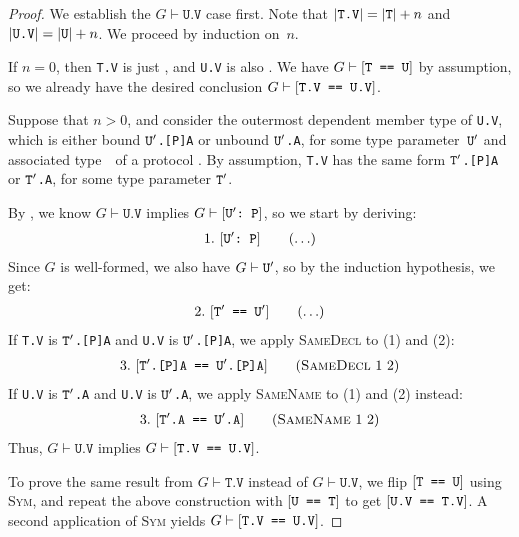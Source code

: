 \documentclass[../generics]{subfiles}
\begin{document}
\begin{proof}
We establish the $G\vdash\texttt{U.V}$ case first. Note that $|\texttt{T.V}|=|\texttt{T}| + n$ and $|\texttt{U.V}|=|\texttt{U}|+n$. We proceed by induction on~$n$.

\BaseCase If $n=0$, then \texttt{T.V} is just \tT, and \texttt{U.V} is also \tU. We have $G\vdash[\texttt{T == U}]$ by assumption, so we already have the desired conclusion $G\vdash[\texttt{T.V == U.V}]$.

\InductiveStep Suppose that $n>0$, and consider the outermost dependent member type of \texttt{U.V}, which is either bound \texttt{$\texttt{U}^\prime$.[P]A} or unbound \texttt{$\texttt{U}^\prime$.A}, for some type parameter~$\texttt{U}^\prime$ and associated type~\nA\ of a protocol \tP. By assumption, \texttt{T.V} has the same form \texttt{$\texttt{T}^\prime$.[P]A} or \texttt{$\texttt{T}^\prime$.A}, for some type parameter $\texttt{T}^\prime$.

By , we know $G\vdash\texttt{U.V}$ implies $G\vdash[\texttt{$\texttt{U}^\prime$:~P}]$, so we start by deriving:
\begin{gather*}
\AnyStep{\ConfReq{$\tUp$}{P}}{1}
\end{gather*}
Since $G$ is well-formed, we also have $G\vdash\texttt{U}^\prime$, so by the induction hypothesis, we get:
\begin{gather*}
\AnyStep{\SameReq{$\tTp$}{$\tUp$}}{2}
\end{gather*}
If \texttt{T.V} is \texttt{$\texttt{T}^\prime$.[P]A} and \texttt{U.V} is \texttt{$\texttt{U}^\prime$.[P]A}, we apply \textsc{SameDecl} to (1) and (2):
\begin{gather*}
\SameDeclStep{1}{2}{$\tTp$.[P]A}{$\tUp$.[P]A}{3}
\end{gather*}
If \texttt{U.V} is \texttt{$\texttt{T}^\prime$.A} and \texttt{U.V} is \texttt{$\texttt{U}^\prime$.A}, we apply \textsc{SameName} to (1) and (2) instead:
\begin{gather*}
\SameNameStep{1}{2}{$\tTp$.A}{$\tUp$.A}{3}
\end{gather*}
Thus, $G\vdash\texttt{U.V}$ implies $G\vdash[\texttt{T.V == U.V}]$.

To prove the same result from $G\vdash\texttt{T.V}$ instead of $G\vdash\texttt{U.V}$, we flip $[\texttt{T == U}]$ using \textsc{Sym}, and repeat the above construction with $[\texttt{U == T}]$ to get $[\texttt{U.V == T.V}]$. A second application of \textsc{Sym} yields $G\vdash[\texttt{T.V == U.V}]$.
\end{proof}
\end{document}
